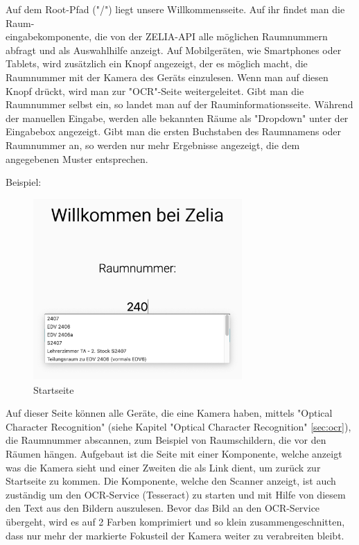 \label{sec:webcompstart}

Auf dem Root-Pfad ("/") liegt unsere Willkommensseite. Auf ihr findet man die Raum-\\eingabekomponente, die von der ZELIA-API alle möglichen Raumnummern abfragt und als Auswahlhilfe anzeigt. Auf Mobilgeräten, wie Smartphones oder Tablets, wird zusätzlich ein Knopf angezeigt, der es möglich macht, die Raumnummer mit der Kamera des Geräts einzulesen. Wenn man auf diesen Knopf drückt, wird man zur "OCR"-Seite weitergeleitet. Gibt man die Raumnummer selbst ein, so landet man auf der Rauminformationsseite. Während der manuellen Eingabe, werden alle bekannten Räume als "Dropdown" unter der Eingabebox angezeigt. Gibt man die ersten Buchstaben des Raumnamens oder Raumnummer an, so werden nur mehr Ergebnisse angezeigt, die dem angegebenen Muster entsprechen.

Beispiel:

\begin{figure}[H]
    \centering
    \includegraphics[width=80mm]{media/WebComponents/Startseite_light.png}
    \caption{Startseite}
    \label{fig:compinput}
\end{figure}



Auf dieser Seite können alle Geräte, die eine Kamera haben, mittels "Optical Character Recognition" (siehe Kapitel "Optical Character Recognition" \ref{sec:ocr}), die Raumnummer abscannen, zum Beispiel von Raumschildern, die vor den Räumen hängen. Aufgebaut ist die Seite mit einer Komponente, welche anzeigt was die Kamera sieht und einer Zweiten die als Link dient, um zurück zur Startseite zu kommen. Die Komponente, welche den Scanner anzeigt, ist auch zuständig um den OCR-Service (Tesseract) zu starten und mit Hilfe von diesem den Text aus den Bildern auszulesen. Bevor das Bild an den OCR-Service übergeht, wird es auf 2 Farben komprimiert und so klein zusammengeschnitten, dass nur mehr der markierte Fokusteil der Kamera weiter zu verabreiten bleibt.

